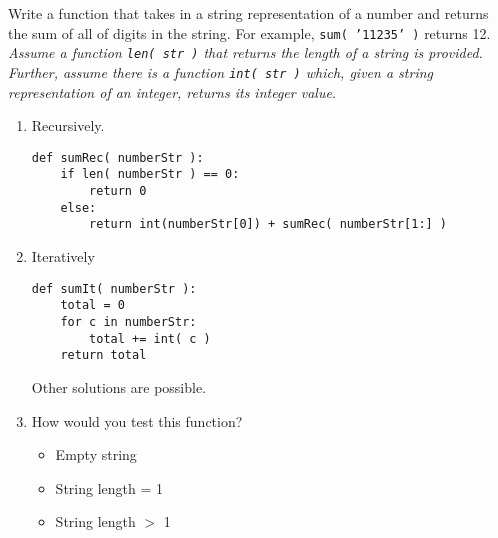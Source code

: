 Write a function that takes in a string representation of a number and returns the sum
        of all of digits in the string. For example, \texttt{sum( '11235' )} returns 12. \\
        \emph{Assume a function \texttt{len( str )} that returns the length of a string is provided. \\
         Further, assume there is a function \texttt{int( str )} which, given a string representation of an integer, returns its integer value.}

        \begin{enumerate}
            \item Recursively. 
\begin{answer}
\begin{lstlisting}
def sumRec( numberStr ):
    if len( numberStr ) == 0:
        return 0
    else:
        return int(numberStr[0]) + sumRec( numberStr[1:] )
\end{lstlisting}
\end{answer}

            \item Iteratively
\begin{answer}
\begin{lstlisting}
def sumIt( numberStr ):
    total = 0
    for c in numberStr:
        total += int( c )
    return total
\end{lstlisting}
Other solutions are possible.
\end{answer}
            \vspace{.25in}
    		\item How would you test this function?
                \begin{answer}
                \begin{itemize}
                    \item Empty string 
                    \item String length = 1
                    \item String length $>$ 1
                \end{itemize}
                \end{answer}
\end{enumerate}
